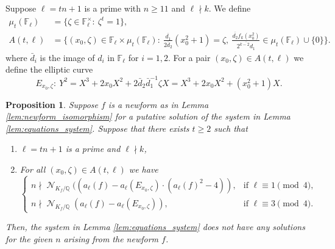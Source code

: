 \documentclass[12pt]{amsart}
\numberwithin{equation}{section}
\newtheorem{proposition}[lemma]{Proposition}
\theoremstyle{definition}
\theoremstyle{remark}
\newcommand{\QQ}{\mathbb{Q}}
\newcommand{\Fl}{\mathbb{F}_{\ell}}
\DeclareMathOperator{\Norm}{\mathcal{N}}
\begin{document}
Suppose $\ell= tn+1$ is a prime with $n\geq 11$ and $\ell\nmid k$. We define
\begin{align*}
    \mu_t(\Fl) & =\big\{\zeta\in\Fl^\times:~\zeta^t=1\big\},\\ 
    A(t,\ell) & =\big\{(x_0, \zeta)\in\Fl\times\mu_t(\Fl): ~\frac{\overline{d_1}}{\overline{2d_2}}(x_0^2+1)=\zeta,~\frac{\overline{d_2}f_k(x_0^2)}{\overline{2^{k-2}d_1}}\in\mu_t(\Fl)\cup\{0\}\big\}.
\end{align*}
where $\bar{d}_i$ is the image of $d_i$ in $\Fl$ for $i=1,2$. For a pair $(x_0,\zeta)\in A(t,\ell)$ we define the elliptic curve
\begin{equation*}
    E_{x_0,\zeta}:~Y^2=X^3 + 2x_0X^2+2\bar{d}_2\bar{d}_1^{-1}\zeta X= X^3 + 2x_0X^2+(x_0^2+1)X.
\end{equation*}

%
\begin{proposition}\label{prop:eliminate_fix_n}
Suppose $f$ is a newform as in Lemma \ref{lem:newform_isomorphism} for a putative solution of the system in Lemma \ref{lem:equations_system}. 
Suppose that there exists $t\geq 2$ such that
\begin{enumerate}
    \item $\ell=tn+1$ is a prime and $\ell\nmid k$,
    \item For all $(x_0,\zeta)\in A(t,\ell)$ we have
    \begin{equation*}
        \begin{cases}
            n\nmid\Norm_{K_f/\QQ}((a_\ell(f) - a_{\ell}(E_{x_0,\zeta})\cdot(a_\ell(f)^2 - 4)), & \text{if } \ell\equiv 1\pmod{4}, \\
            n\nmid\Norm_{K_f/\QQ}(a_\ell(f) - a_{\ell}(E_{x_0,\zeta})), & \text{if } \ell\equiv 3\pmod{4}.
        \end{cases}
    \end{equation*}
\end{enumerate}
Then, the system in Lemma \ref{lem:equations_system} does not have any solutions for the given $n$ arising from the newform $f$. 
\end{proposition}
\end{document}
